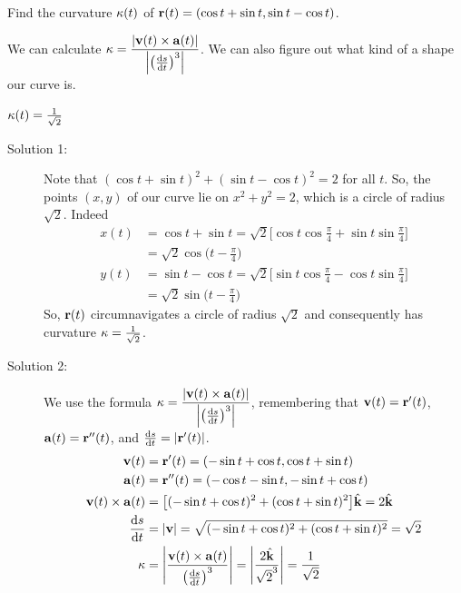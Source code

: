 \begin{question}
Find the curvature $\kappa(t)$ of $\mathbf{r}(t)=(\cos t+\sin t , \sin t - \cos t)$.
\end{question}
\begin{hint}
We can calculate $\ka = \dfrac{|\vv(t) \times \va(t)|}{\left| \left(\diff{s}{t}\right)^3\right|}$. We can also figure out what kind of a shape our curve is.
\end{hint}
\begin{answer}
$\kappa(t)=\frac{1}{\sqrt{2}}$
\end{answer}
\begin{solution}
\begin{description}
\item[Solution 1:] Note that $(\cos t+\sin t )^2+(\sin t - \cos t)^2=2$ for all $t$. So, the points $(x,y)$ of our curve lie on $x^2+y^2=2$, which is a circle of radius $\sqrt{2}$. Indeed
\begin{align*}
x(t)&= \cos t+\sin t 
=\sqrt{2}\big[\cos t \cos\tfrac{\pi}{4} +\sin t \sin\tfrac{\pi}{4}\big]
\\
&=\sqrt{2}\cos\big(t-\tfrac{\pi}{4}\big)
\\
y(t)&= \sin t-\cos t 
=\sqrt{2}\big[\sin t \cos\tfrac{\pi}{4}-\cos t\sin \tfrac{\pi}{4}\big]
\\
&=\sqrt{2}\sin\big(t-\tfrac{\pi}{4}\big)
\end{align*}
So, $\mathbf{r}(t)$ circumnavigates a circle of radius $\sqrt{2}$ and consequently has curvature $\kappa=\frac{1}{\sqrt{2}}$.
\item[Solution 2:]
We use the formula $\ka = \dfrac{|\vv(t) \times \va(t)|}{\left| \left(\diff{s}{t}\right)^3\right|}$, remembering that $\mathbf{v}(t)=\mathbf{r}'(t)$, $\mathbf{a}(t)=\mathbf{r}''(t)$, and $\diff{s}{t}=\left| \vr'(t)\right|$.
\begin{align*}
\vv(t)&=\vr'(t)=(-\sin t +\cos t, \cos t + \sin t)\\
\va(t)&=\vr''(t)=(-\cos t  -\sin t, -\sin t + \cos t)\\
\vv(t) \times \va(t)&=\big[(-\sin t + \cos t)^2+(\cos t + \sin t)^2\big]\hk=2\hk\\
\diff{s}{t}&=|\vv|=\sqrt{(-\sin t + \cos t)^2+(\cos t + \sin t )^2}=\sqrt2\\
\ka&=\left|\frac{\vv(t) \times \va(t)}{\left(\diff{s}{t}\right)^3}\right|=\left|\frac{2\hk}{\sqrt{2}^3}\right|=\frac{1}{\sqrt 2}
\end{align*}
\end{description}
\end{solution}

